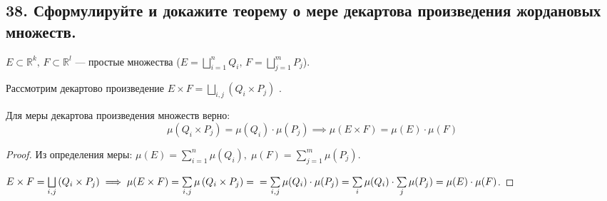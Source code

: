 
\subsection*{38. Сформулируйте и докажите теорему о мере декартова произведения жордановых множеств.}
    \begin{theorem}
        $E \subset \mathbb{R}^k, \, F \subset \mathbb{R}^l$ --- простые множества 
        ($E = \bigsqcup\limits_{i=1}^n Q_i, \, F = \bigsqcup\limits_{j=1}^m P_j$).
        
        Рассмотрим декартово произведение $E \times F = \bigsqcup\limits_{i, j} \left( Q_i \times P_j \right)$ .
        
        Для меры декартова произведения множеств верно:
        \[ \mu(Q_i \times P_j) = \mu(Q_i) \cdot \mu(P_j) \implies \mu(E \times F) = \mu(E) \cdot \mu(F) \]
    \end{theorem}
    \begin{proof}
        Из определения меры: 
        $\mu(E) = \sum\limits_{i=1}^n \mu(Q_i), \; \mu(F) = \sum\limits_{j=1}^m \mu(P_j)$.
        
        $E \times F = \bigsqcup\limits_{i, j} \left( Q_i \times P_j \right) \implies \mu(E \times F) 
        = \sum\limits_{i, j} \mu\left( Q_i \times P_j \right) =\\
        = \sum\limits_{i, j} \mu(Q_i) \cdot \mu(P_j) = \sum\limits_{i} \mu(Q_i) \cdot \sum\limits_{j} \mu(P_j) 
        = \mu(E) \cdot \mu(F)$.
    \end{proof}

